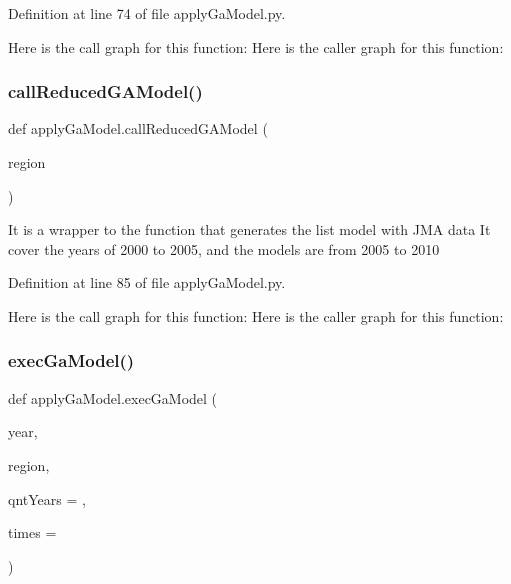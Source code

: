 Definition at line 74 of file apply\+Ga\+Model.\+py.

Here is the call graph for this function\+:
Here is the caller graph for this function\+:
\mbox{\label{namespaceapply_ga_model_a114bca108bfb9f8c99faec2ad523fff0}} 
\subsubsection{\texorpdfstring{call\+Reduced\+G\+A\+Model()}{callReducedGAModel()}}
{\footnotesize\ttfamily def apply\+Ga\+Model.\+call\+Reduced\+G\+A\+Model (\begin{DoxyParamCaption}\item[{}]{region }\end{DoxyParamCaption})}

\begin{DoxyVerb}It is a wrapper to the function that generates the list model with JMA data
It cover the years of 2000 to 2005, and the models are from 2005 to 2010
\end{DoxyVerb}
 

Definition at line 85 of file apply\+Ga\+Model.\+py.

Here is the call graph for this function\+:
Here is the caller graph for this function\+:
\mbox{\label{namespaceapply_ga_model_ab1a6aa8daf49dc086e44c199e7d470f3}} 
\subsubsection{\texorpdfstring{exec\+Ga\+Model()}{execGaModel()}}
{\footnotesize\ttfamily def apply\+Ga\+Model.\+exec\+Ga\+Model (\begin{DoxyParamCaption}\item[{}]{year,  }\item[{}]{region,  }\item[{}]{qnt\+Years = {},  }\item[{}]{times = {} }\end{DoxyParamCaption})}

